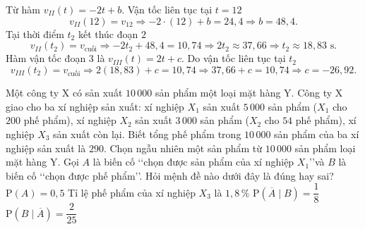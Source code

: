 \begin{ex}
{\begin{itemchoice}
			Từ hàm $v_{II}(t) = -2t + b$. Vận tốc liên tục tại $t=12$
			\[ v_{II}(12) = v_{12} \Rightarrow -2\cdot(12) + b = 24{,}4 \Rightarrow b = 48{,}4. \]
			Tại thời điểm $t_2$ kết thúc đoạn $2$
			\[ v_{II}(t_2) = v_\text{cuối} \Rightarrow -2t_2 + 48{,}4 = 10{,}74 \Rightarrow 2t_2 \approx 37{,}66 \Rightarrow t_2 \approx 18{,}83\text{ s}. \]
			Hàm vận tốc đoạn 3 là $v_{III}(t) = 2t + c$. Do vận tốc liên tục tại $t_2$
			\[ v_{III}(t_2) = v_\text{cuối} \Rightarrow 2(18{,}83) + c = 10{,}74 \Rightarrow 37{,}66 + c = 10{,}74 \Rightarrow c = -26{,}92. \]
		\end{itemchoice}
	}
\end{ex}

\begin{ex}%
	Một công ty X có sản xuất $10\,000$ sản phẩm một loại mặt hàng Y. Công ty X giao cho ba xí nghiệp sản xuất: xí nghiệp $X_1$ sản xuất $5\,000$ sản phẩm ($X_1$ cho $200$ phế phẩm), xí nghiệp $X_2$ sản xuất $3\,000$ sản phẩm ($X_2$ cho $54$ phế phẩm), xí nghiệp $X_3$ sản xuất còn lại. Biết tổng phế phẩm trong $10\,000$ sản phẩm của ba xí nghiệp sản xuất là $290$. Chọn ngẫu nhiên một sản phẩm từ $10\,000$ sản phẩm loại mặt hàng Y. Gọi $A$ là biến cố \lq\lq chọn được sản phẩm của xí nghiệp $X_1$\rq\rq và $B$ là biến cố \lq\lq chọn được phế phẩm\rq\rq. Hỏi mệnh đề nào dưới đây là đúng hay sai?
	\choiceTF
	{\True $\mathrm{P}(A) = 0{,}5$}
	{\True Tỉ lệ phế phẩm của xí nghiệp $X_3$ là $1{,}8\,\%$}
	{$\mathrm{P}(\overline{A} \mid B) = \dfrac{1}{8}$}
	{$\mathrm{P}(B \mid \overline{A}) = \dfrac{2}{25}$}
\end{ex}
